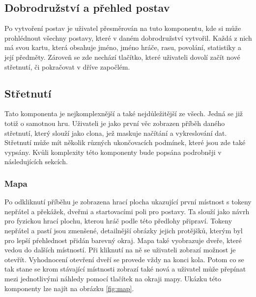 \subsection{Dobrodružství a přehled postav}
Po vytvoření postav je uživatel přesměrován na tuto komponentu, kde si může prohlédnout všechny postavy, které v daném dobrodružství vytvořil. Každá z nich má svou kartu, která obsahuje jméno, jméno hráče, rasu, povolání, statistiky a její předměty. Zároveň se zde nechází tlačítko, které uživateli dovolí začít nové střetnutí, či pokračovat v dříve započlém.

\subsection{Střetnutí}
Tato komponenta je nejkomplexnější a také nejdůležitější ze všech. Jedná se již totiž o samotnou hru. Uživateli je jako první věc zobrazen příběh daného střetnutí, který slouží jako clona, jež maskuje načítání a vykreslování dat. Střetnutí může mít několik různých ukončovacích podmínek, které jsou zde také vypsány. Kvůli komplexity této komponenty bude popsána podrobněji v následujících sekcích.

\subsubsection*{Mapa}
Po odkliknutí příběhu je zobrazena hrací plocha ukazující první místnost s tokeny nepřátel a překážek, dveřmi a startovacími poli pro postavy. Ta slouží jako návrh pro fyzickou hrací plochu, kterou hráč podle této předlohy připraví. Tokeny nepřátel a pastí jsou zmenšené, detailnější obrázky jejich protějšků, kterým byl pro lepší pŕehlednost přidán barevný okraj. Mapa také vyobrazuje dveře, které vedou do dalších místností. Při kliknutí na ně se uživateli zobrazí možnost je otevřít. Vyhodnocení otevření dveří se provede vždy na konci kola. Potom co se tak stane se krom stávající místnosti zobrazí také nová a uživatel může přepínat mezi jednotlivými náhledy pomocí tlačítek na okraji mapy. Ukázku této komponenty lze najít na obrázku \ref{fig:map}.

